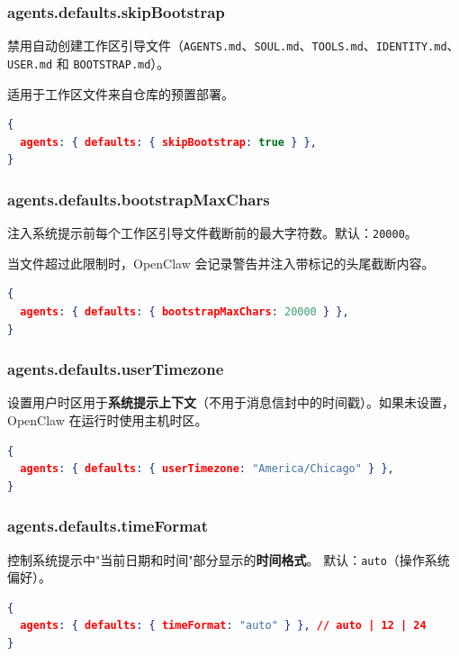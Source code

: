 \subsubsection{agents.defaults.skipBootstrap}


禁用自动创建工作区引导文件（\texttt{AGENTS.md}、\texttt{SOUL.md}、\texttt{TOOLS.md}、\texttt{IDENTITY.md}、\texttt{USER.md} 和 \texttt{BOOTSTRAP.md}）。

适用于工作区文件来自仓库的预置部署。

\begin{lstlisting}[language=json]
{
  agents: { defaults: { skipBootstrap: true } },
}
\end{lstlisting}


\subsubsection{agents.defaults.bootstrapMaxChars}


注入系统提示前每个工作区引导文件截断前的最大字符数。默认：\texttt{20000}。

当文件超过此限制时，OpenClaw 会记录警告并注入带标记的头尾截断内容。

\begin{lstlisting}[language=json]
{
  agents: { defaults: { bootstrapMaxChars: 20000 } },
}
\end{lstlisting}


\subsubsection{agents.defaults.userTimezone}


设置用户时区用于\textbf{系统提示上下文}（不用于消息信封中的时间戳）。如果未设置，OpenClaw 在运行时使用主机时区。

\begin{lstlisting}[language=json]
{
  agents: { defaults: { userTimezone: "America/Chicago" } },
}
\end{lstlisting}


\subsubsection{agents.defaults.timeFormat}


控制系统提示中"当前日期和时间"部分显示的\textbf{时间格式}。
默认：\texttt{auto}（操作系统偏好）。

\begin{lstlisting}[language=json]
{
  agents: { defaults: { timeFormat: "auto" } }, // auto | 12 | 24
}
\end{lstlisting}


